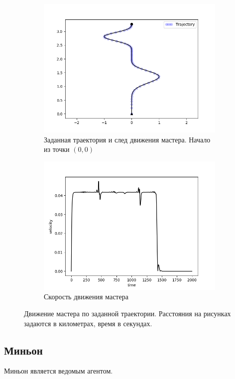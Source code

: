 \documentclass[12pt,a4paper]{article}
\begin{document}
\begin{figure}[!htbp]
	\centering
	\begin{subfigure}{.5\textwidth}
		\centering
		\includegraphics[width=1\linewidth]{master-trajectory-0}
		\caption{Заданная траектория и след движения мастера. Начало из точки $(0, 0)$}
		\label{fig:sub1}
	\end{subfigure}%
	\begin{subfigure}{.5\textwidth}
		\centering
		\includegraphics[width=1\linewidth]{master-trajectory-0-velocity}
		\caption{Скорость движения мастера}
		\label{fig:sub2}
	\end{subfigure}
	\caption{Движение мастера по заданной траектории. Расстояния на рисунках задаются в километрах, время в секундах.}
	\label{fig:test}
\end{figure}


\subsection{Миньон}
Миньон является ведомым агентом.  
\end{document}
